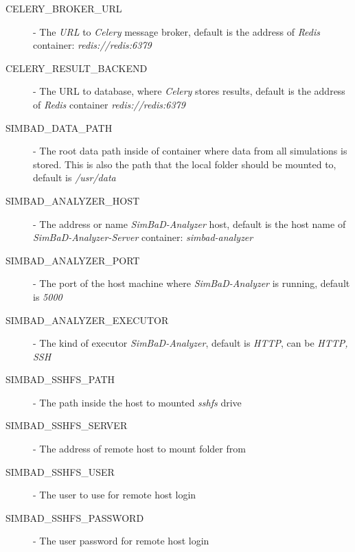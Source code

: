 \begin{description}
    \item
        [CELERY\_BROKER\_URL] - The \textit{URL} to \textit{Celery} message broker, default is the address of \textit{Redis} container: \emph{redis://redis:6379}
    
    \item 
        [CELERY\_RESULT\_BACKEND] - The URL to database, where \textit{Celery} stores results, default is the address of \textit{Redis} container \emph{redis://redis:6379}
    
    \item 
        [SIMBAD\_DATA\_PATH] - The root data path inside of container where data from all simulations is stored. This is also the path that the local folder should be mounted to, default is \emph{/usr/data}
    
    \item 
        [SIMBAD\_ANALYZER\_HOST] - The address or name \textit{SimBaD-Analyzer} host, default is the host name of \textit{SimBaD-Analyzer-Server} container: \emph{simbad-analyzer}
    
    \item 
        [SIMBAD\_ANALYZER\_PORT] - The port of the host machine where \textit{SimBaD-Analyzer} is running, default is \emph{5000} 
    
    \item 
        [SIMBAD\_ANALYZER\_EXECUTOR] - The kind of executor \textit{SimBaD-Analyzer}, default is \textit{HTTP}, can be \textit{HTTP, SSH}
    
    \item 
        [SIMBAD\_SSHFS\_PATH] - The path inside the host to mounted \textit{sshfs} drive
    
    \item 
        [SIMBAD\_SSHFS\_SERVER] - The address of remote host to mount folder from
    
    \item 
        [SIMBAD\_SSHFS\_USER] - The user to use for remote host login
    
    \item 
        [SIMBAD\_SSHFS\_PASSWORD] - The user password for remote host login
    
\end{description}
